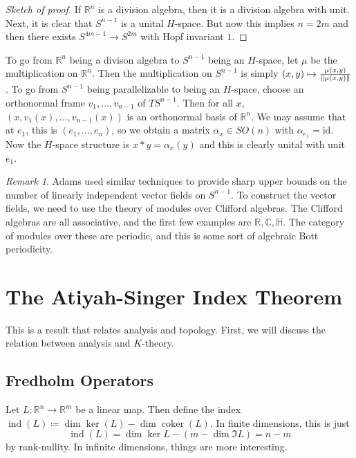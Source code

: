 \documentclass[leqno, openany]{memoir}
\theoremstyle{definition}
\theoremstyle{remark}
\newtheorem{rmk}[thm]{Remark}
\theoremstyle{plain}
\theoremstyle{definition}
\theoremstyle{remark}
\newcommand{\R}{\mathbb{R}}
\newcommand{\C}{\mathbb{C}}
\newcommand{\mr}[1]{\mathrm{#1}}
\DeclareMathOperator{\coker}{coker}
\DeclareMathOperator{\ind}{ind}
\begin{document}
\begin{proof}[Sketch of proof] If $\R^n$ is a division algebra, then it is a
    division algebra with unit. Next, it is clear that $S^{n-1}$ is a unital
    $H$-space. But now this implies $n = 2m$ and then there exists $S^{4m-1}
    \to S^{2m}$ with Hopf invariant $1$.  \end{proof}

To go from $\R^n$ being a divison algebra to $S^{n-1}$ being an $H$-space, let
$\mu$ be the multiplication on $\R^n$. Then the multiplication on $S^{n-1}$ is
simply $(x,y) \mapsto \frac{\mu(x,y)}{\norm{\mu(x,y)}}$. To go from $S^{n-1}$
being parallelizable to being an $H$-space, choose an orthonormal frame $v_1,
\ldots, v_{n-1}$ of $TS^{n-1}$. Then for all $x$, $(x, v_1(x), \ldots,
v_{n-1}(x))$ is an orthonormal basis of $\R^n$. We may assume that at $e_1$,
this is $(e_1, \ldots, e_n)$, so we obtain a matrix $\alpha_x \in SO(n)$ with
$\alpha_{e_1} = \mr{id}$. Now the $H$-space structure is $x * y = \alpha_x(y)$
and this is clearly unital with unit $e_1$.

\begin{rmk} Adams used similar techniques to provide sharp upper bounds on the
    number of linearly independent vector fields on $S^{n-1}$. To construct the
    vector fields, we need to use the theory of modules over Clifford algebras.
    The Clifford algebras are all associative, and the first few examples are
    $\R, \C, \mathbb{H}$. The category of modules over these are periodic, and
    this is some sort of algebraic Bott periodicity.  \end{rmk}

\chapter{The Atiyah-Singer Index Theorem}%
\label{cha:the_atiyah_singer_index_theorem}

This is a result that relates analysis and topology. First, we will discuss the
relation between analysis and $K$-theory.

\section{Fredholm Operators}%

Let $L \colon \R^n \to \R^m$ be a linear map. Then define the index $\ind(L)
\coloneqq \dim \ker (L) - \dim \coker(L)$. In finite dimensions, this is just
\[ \ind(L) = \dim \ker L - (m - \dim \Im L) = n-m \] by rank-nullity. In
infinite dimensions, things are more interesting.
\end{document}
